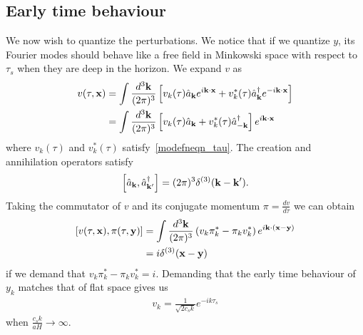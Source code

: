     \subsection{Early time behaviour}
    We now wish to quantize the perturbations. We notice that if we quantize $y$, its Fourier modes
    should behave like a free field in Minkowski space with respect to $\tau_s$
    when they are deep in the horizon. We expand $v$ as
    \begin{align}\label{operator_expansion}
        v(\tau,\mathbf{x}) &= \int\frac{d^3\mathbf{k}}{(2\pi)^3}\left[
            v_k(\tau)\hat{a}_{\mathbf{k}} e^{i\mathbf{k}\cdot\mathbf{x}}+
            v^*_k(\tau)\hat{a}^{\dagger}_{\mathbf{k}} e^{-i\mathbf{k}\cdot\mathbf{x}}
        \right]\\
            &= \int\frac{d^3\mathbf{k}}{(2\pi)^3}\left[
            v_k(\tau)\hat{a}_{\mathbf{k}} +
            v^*_k(\tau)\hat{a}^{\dagger}_{-\mathbf{k}}
        \right]e^{i\mathbf{k}\cdot\mathbf{x}}
    \end{align}
    where $v_k(\tau)$ and $v^*_k(\tau)$ satisfy~\eqref{modefneqn_tau}.
    The creation and annihilation operators satisfy
    \begin{align}\label{creation_annihilation_commutator}
        \left[\hat{a}_{\mathbf{k}},\hat{a}^{\dagger}_{\mathbf{k}'}\right] = (2\pi)^3\delta^{(3)}(\mathbf{k}-\mathbf{k}').
    \end{align}
    Taking the commutator of $v$ and its conjugate momentum $\pi=\frac{dv}{d\tau}$
    we can obtain
    \begin{align}
        \left[v(\tau,\mathbf{x}),\pi(\tau,\mathbf{y})\right] &=
        \int \frac{d^3 \mathbf{k}}{(2\pi)^3}\left(v_k\pi^*_k-\pi_kv^*_k\right)e^{i\mathbf{k}\cdot(\mathbf{x}-\mathbf{y})}\\
        &= i \delta^{(3)}(\mathbf{x}-\mathbf{y})
    \end{align}
    if we demand that $v_k\pi^*_k-\pi_kv^*_k=i$.
    Demanding that the early time behaviour of $y_k$ matches that of flat space
    gives us
    \begin{align}
        v_k = \frac{1}{\sqrt{2{c_s}k}}e^{-ik\tau_s}
    \end{align}
    when $\frac{{c_s}k}{aH}\rightarrow \infty$.


